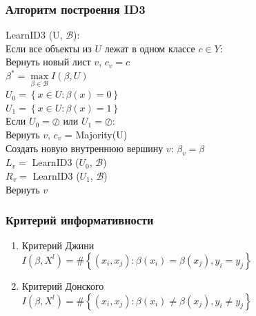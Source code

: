 \documentclass[12pt]{beamer}
\begin{document}
\begin{frame}\frametitle{Алгоритм построения ID3}
LearnID3 (U, $\mathcal{B}$):\\
\hspace{10mm} Если все объекты из $U$ лежат в одном классе $c \in Y$: \\
\hspace{20mm} Вернуть новый лист $v$, $c_v = c$\\
\vspace{3mm}
\hspace{10mm} $\beta^* = \max\limits_{\beta \in \mathcal{B}} I(\beta, U)$\\
\vspace{3mm}
\hspace{10mm} $U_0 = \left\{ x \in U : \beta(x) = 0\right\}$	\\
\hspace{10mm} $U_1 = \left\{ x \in U : \beta(x) = 1\right\}$	\\
\vspace{3mm}
\hspace{10mm} Если $U_0 = \oslash$ или $U_1 = \oslash$:\\ 
\hspace{20mm} Вернуть $v$, $c_v$ = Majority(U)\\
\vspace{3mm}
\hspace{10mm} Создать новую внутреннюю вершину $v$: $\beta_v = \beta$\\
\vspace{3mm}
\hspace{10mm} $L_v =$ LearnID3 ($U_0$, $\mathcal{B}$)\\
\hspace{10mm} $R_v =$ LearnID3 ($U_1$, $\mathcal{B}$)\\
\hspace{10mm} Вернуть $v$
\end{frame}

\begin{frame}\frametitle{Критерий информативности}
\begin{enumerate}[--]
\item Критерий Джини\\
$I(\beta,X^l)= \# \left\{ (x_i, x_j): \beta(x_i) = \beta(x_j), y_i = y_j \right\}$
\item Критерий Донского\\
$I(\beta,X^l)= \# \left\{ (x_i, x_j): \beta(x_i) \neq \beta(x_j), y_i \neq y_j \right\}$
\end{enumerate}
\end{frame}
\end{document}
